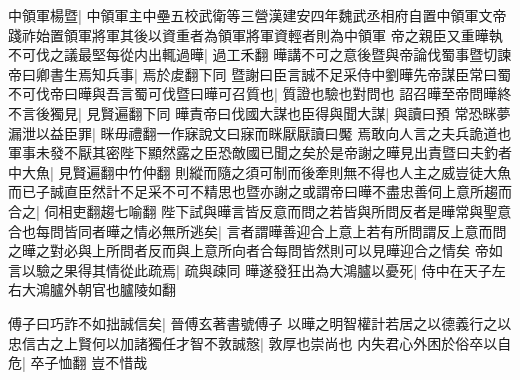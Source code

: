 中領軍楊暨|{
	中領軍主中壘五校武衛等三營漢建安四年魏武丞相府自置中領軍文帝踐祚始置領軍將軍其後以資重者為領軍將軍資輕者則為中領軍}
帝之親臣又重曄執不可伐之議最堅每從内出輒過曄|{
	過工禾翻}
曄講不可之意後暨與帝論伐蜀事暨切諫帝曰卿書生焉知兵事|{
	焉於䖍翻下同}
暨謝曰臣言誠不足采侍中劉曄先帝謀臣常曰蜀不可伐帝曰曄與吾言蜀可伐暨曰曄可召質也|{
	質證也驗也對問也}
詔召曄至帝問曄終不言後獨見|{
	見賢遍翻下同}
曄責帝曰伐國大謀也臣得與聞大謀|{
	與讀曰預}
常恐眯夢漏泄以益臣罪|{
	眯毋禮翻一作寐說文曰寐而眯厭厭讀曰魘}
焉敢向人言之夫兵詭道也軍事未發不厭其密陛下顯然露之臣恐敵國已聞之矣於是帝謝之曄見出責暨曰夫釣者中大魚|{
	見賢遍翻中竹仲翻}
則縱而隨之須可制而後牽則無不得也人主之威豈徒大魚而已子誠直臣然計不足采不可不精思也暨亦謝之或謂帝曰曄不盡忠善伺上意所趨而合之|{
	伺相吏翻趨七喻翻}
陛下試與曄言皆反意而問之若皆與所問反者是曄常與聖意合也每問皆同者曄之情必無所逃矣|{
	言者謂曄善迎合上意上若有所問謂反上意而問之曄之對必與上所問者反而與上意所向者合每問皆然則可以見曄迎合之情矣}
帝如言以驗之果得其情從此疏焉|{
	疏與疎同}
曄遂發狂出為大鴻臚以憂死|{
	侍中在天子左右大鴻臚外朝官也臚陵如翻}


傅子曰巧詐不如拙誠信矣|{
	晉傅玄著書號傅子}
以曄之明智權計若居之以德義行之以忠信古之上賢何以加諸獨任才智不敦誠慤|{
	敦厚也崇尚也}
内失君心外困於俗卒以自危|{
	卒子恤翻}
豈不惜哉

